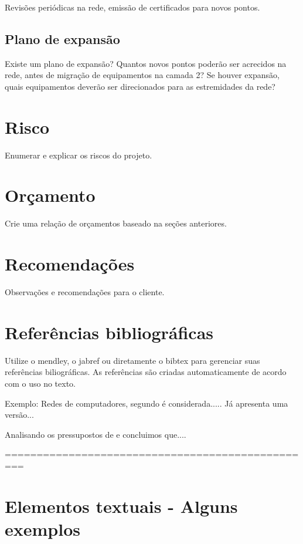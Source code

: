 \documentclass[	DIV=calc,%
							paper=a4,%
							fontsize=12pt,%
							onecolumn]{scrartcl}	 					%
\begin{document}
Revisões periódicas na rede, emissão de certificados para novos pontos.

\subsection{Plano de expansão}
Existe um plano de expansão? Quantos novos pontos poderão ser acrecidos na rede, antes de migração de equipamentos na camada 2? Se houver expansão, quais equipamentos deverão ser direcionados para as estremidades da rede? 

\section{Risco}
Enumerar e explicar os riscos do projeto.

\section{Orçamento}
Crie uma relação de orçamentos baseado na seções anteriores.

\section{Recomendações}
Observações e recomendações para o cliente.

\section{Referências bibliográficas}
Utilize o mendley, o jabref ou diretamente o bibtex para gerenciar suas referências biliográficas. As referências são criadas automaticamente de acordo com o uso no texto.

Exemplo: Redes de computadores, segundo \cite{t2013} é considerada..... Já \cite{kurose2010} apresenta uma versão...

Analisando os pressupostos de \cite{ref3} e \cite{ref4} concluimos que....


\renewcommand\refname{} %

  

=================================================
\section{Elementos textuais - Alguns exemplos}
\end{document}
